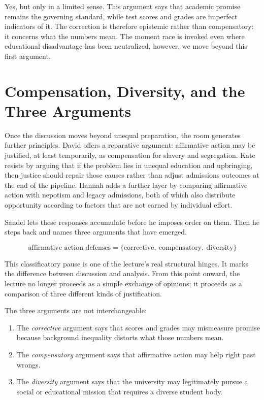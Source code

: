 Yes, but only in a limited sense. This argument says that academic promise remains the governing standard, while test scores and grades are imperfect indicators of it. The correction is therefore epistemic rather than compensatory: it concerns what the numbers mean. The moment race is invoked even where educational disadvantage has been neutralized, however, we move beyond this first argument.

\section{Compensation, Diversity, and the Three Arguments}

Once the discussion moves beyond unequal preparation, the room generates further principles. David offers a reparative argument: affirmative action may be justified, at least temporarily, as compensation for slavery and segregation. Kate resists by arguing that if the problem lies in unequal education and upbringing, then justice should repair those causes rather than adjust admissions outcomes at the end of the pipeline. Hannah adds a further layer by comparing affirmative action with nepotism and legacy admissions, both of which also distribute opportunity according to factors that are not earned by individual effort.

Sandel lets these responses accumulate before he imposes order on them. Then he steps back and names three arguments that have emerged.

\begin{equation}
\text{affirmative action defenses}
=
\{\text{corrective},\ \text{compensatory},\ \text{diversity}\}
\end{equation}

This classificatory pause is one of the lecture's real structural hinges. It marks the difference between discussion and analysis. From this point onward, the lecture no longer proceeds as a simple exchange of opinions; it proceeds as a comparison of three different kinds of justification.

The three arguments are not interchangeable:
\begin{enumerate}
\item The \emph{corrective} argument says that scores and grades may mismeasure promise because background inequality distorts what those numbers mean.
\item The \emph{compensatory} argument says that affirmative action may help right past wrongs.
\item The \emph{diversity} argument says that the university may legitimately pursue a social or educational mission that requires a diverse student body.
\end{enumerate}

